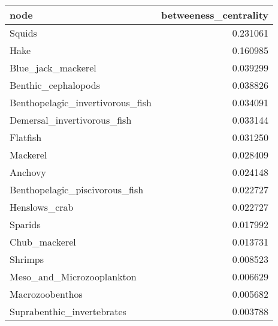 \begin{tabular}{lr}
\toprule
                            node &  betweeness\_centrality \\
\midrule
                          Squids &               0.231061 \\
                            Hake &               0.160985 \\
              Blue\_jack\_mackerel &               0.039299 \\
             Benthic\_cephalopods &               0.038826 \\
Benthopelagic\_invertivorous\_fish &               0.034091 \\
     Demersal\_invertivorous\_fish &               0.033144 \\
                        Flatfish &               0.031250 \\
                        Mackerel &               0.028409 \\
                         Anchovy &               0.024148 \\
  Benthopelagic\_piscivorous\_fish &               0.022727 \\
                   Henslows\_crab &               0.022727 \\
                         Sparids &               0.017992 \\
                   Chub\_mackerel &               0.013731 \\
                         Shrimps &               0.008523 \\
       Meso\_and\_Microzooplankton &               0.006629 \\
                 Macrozoobenthos &               0.005682 \\
      Suprabenthic\_invertebrates &               0.003788 \\
\bottomrule
\end{tabular}
